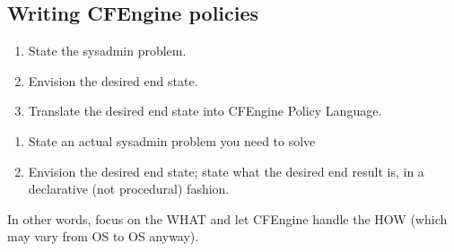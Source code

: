 \subsection{Writing CFEngine policies}

\begin{enumerate}
\item{} State the sysadmin problem.
\item{} Envision the desired end state.
\item{} Translate the desired end state into CFEngine Policy Language.
\end{enumerate}





\begin{aside}
\label{aside:exercise_8}

\begin{enumerate}
\item{} State an actual sysadmin problem you need to solve
\item{} Envision the desired end state; state what the desired end result is, in a declarative (not procedural) fashion.
\end{enumerate}

In other words, focus on the WHAT and let CFEngine handle the HOW (which may vary from OS to OS anyway).

\end{aside}
